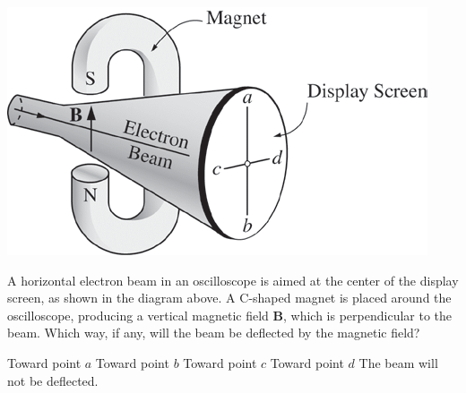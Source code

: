 \begin{center}
\includegraphics[scale=0.5]{images/img-008-021.png}
\end{center}

\begin{questions}\setcounter{question}{28}\question
A horizontal electron beam in an oscilloscope is aimed at the center of the display screen, as shown in the diagram above. A C-shaped magnet is placed around the oscilloscope, producing a vertical magnetic field $\mathbf{B}$, which is perpendicular to the beam. Which way, if any, will the beam be deflected by the magnetic field?

\begin{choices}
\choice Toward point $a$
\choice Toward point $b$
\choice Toward point $c$
\choice Toward point $d$
\choice The beam will not be deflected.
\end{choices}\end{questions}

